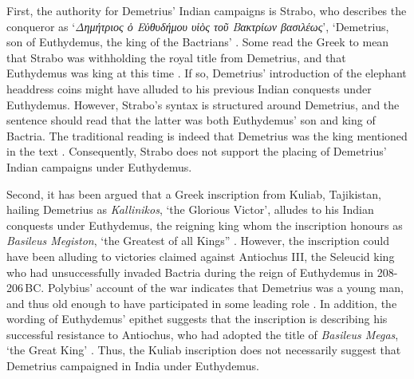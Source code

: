 \documentclass{ijsra}
\renewcommand\BC{{\,BC\xspace}}
\begin{document}
First, the authority for Demetrius’ Indian campaigns is Strabo, who describes the conqueror as ‘\emph{Δημήτριος ὁ Εὐθυδήμου υἱὸς τοῦ Βακτρίων βασιλέως}’,
‘Demetrius, son of Euthydemus, the king of the Bactrians’ \parencite[]{Strab. Geo. 11.11.1}.
Some read the Greek to mean that Strabo was withholding the royal title from Demetrius, and that Euthydemus was king at this time \parencites[157]{Holt2012}[99]{MacDowall2007c}.
If so, Demetrius’ introduction of the elephant headdress coins might have alluded to his previous Indian conquests under Euthydemus.
However, Strabo’s syntax is structured around Demetrius, and the sentence should read that the latter was both Euthydemus’ son and king of Bactria. The traditional reading is indeed that Demetrius was the king mentioned in the text \parencite[144]{Tarn1951}.
Consequently, Strabo does not support the placing of Demetrius’ Indian campaigns under Euthydemus.

Second, it has been argued that a Greek inscription from Kuliab, Tajikistan, hailing Demetrius as \emph{Kallinikos}, ‘the Glorious Victor’, alludes to his Indian conquests under Euthydemus, the reigning king whom the inscription honours as \emph{Basileus Megiston}, ‘the Greatest of all Kings” \parencites[110]{Hollis2011}[125]{Holt2012}[104--105]{MacDowall2007a}[99]{MacDowall2007c}.
However, the inscription could have been alluding to victories claimed against Antiochus III, the Seleucid king who had unsuccessfully invaded Bactria during the reign of Euthydemus in 208-206\BC \parencite[48]{Bopearachchi2007}.
Polybius’ account of the war indicates that Demetrius was a young man, and thus old enough to have participated in some leading role \parencite[]{Pol. Hist. 11.34}.
In addition, the wording of Euthydemus’ epithet suggests that the inscription is describing his successful resistance to Antiochus, who had adopted the title of \emph{Basileus Megas}, ‘the Great King’ \parencites[111]{Hollis2011}[125]{Holt2012}.
Thus, the Kuliab inscription does not necessarily suggest that Demetrius campaigned in India under Euthydemus.
\end{document}
